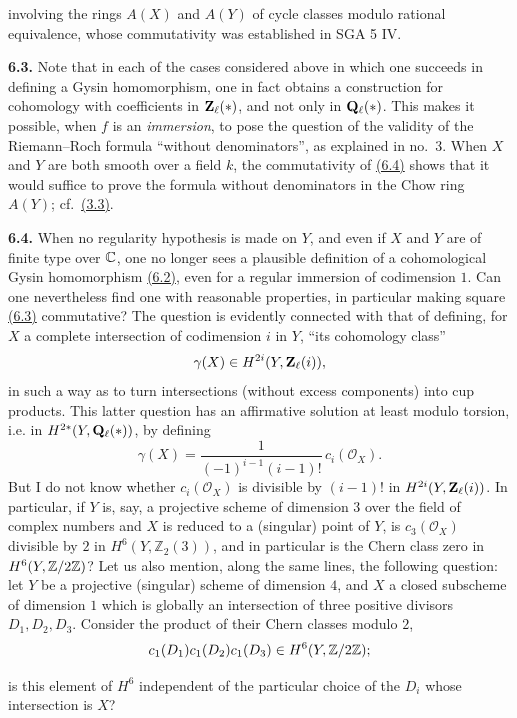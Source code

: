 involving the rings $A(X)$ and $A(Y)$ of cycle classes modulo rational
equivalence, whose commutativity was established in SGA 5 IV.

\noindent{}\textbf{6.3.}
Note that in each of the cases considered above in which one succeeds in
defining a Gysin homomorphism, one in fact obtains a construction for
cohomology with coefficients in $\mathbf Z_\ell(*)$, and not only in $\mathbf Q_\ell(*)$.
This makes it possible, when $f$ is an \emph{immersion}, to pose the question
of the validity of the Riemann--Roch formula ``without denominators'', as
explained in no.~3. When $X$ and $Y$ are both smooth over a field $k$, the
commutativity of \hyperlink{sga6.e14.eq.6-4}{(6.4)} shows that it would suffice to prove the formula
without denominators in the Chow ring $A(Y)$; cf.~\hyperlink{sga6.e14.para.3-3}{(3.3)}.

\noindent{}\textbf{6.4.}
When no regularity hypothesis is made on $Y$, and even if $X$ and $Y$ are of
finite type over $\mathbb C$, one no longer sees a plausible definition of a
cohomological Gysin homomorphism \hyperlink{sga6.e14.para.6-2}{(6.2)}, even for a regular immersion of
codimension $1$. Can one nevertheless find one with reasonable properties,
in particular making square \hyperlink{sga6.e14.para.6-3}{(6.3)} commutative? The question is evidently
connected with that of defining, for $X$ a complete intersection of
codimension $i$ in $Y$, ``its cohomology class''
\[
 \gamma(X)\in H^{2i}(Y,\mathbf Z_\ell(i)),
\]
in such a way as to turn intersections (without excess components) into cup
products. This latter question has an affirmative solution at least modulo
torsion, i.e. in $H^{2*}(Y,\mathbf Q_\ell(*))$, by defining
\[
 \gamma(X)=\frac{1}{(-1)^{i-1}(i-1)!}\,c_i(\mathcal O_X).
\]
But I do not know whether $c_i(\mathcal O_X)$ is divisible by $(i-1)!$ in
$H^{2i}(Y,\mathbf Z_\ell(i))$. In particular, if $Y$ is, say, a projective scheme of
dimension $3$ over the field of complex numbers and $X$ is reduced to a
(singular) point of $Y$, is $c_3(\mathcal O_X)$ divisible by $2$ in
$H^6(Y,\mathbb Z_2(3))$, and in particular is the Chern class zero in
$H^6(Y,\mathbb Z/2\mathbb Z)$? Let us also mention, along the same lines, the following
question: let $Y$ be a projective (singular) scheme of dimension $4$, and
$X$ a closed subscheme of dimension $1$ which is globally an intersection
of three positive divisors $D_1,D_2,D_3$. Consider the product of their
Chern classes modulo $2$,
\[
 c_1(D_1)c_1(D_2)c_1(D_3)\in H^6(Y,\mathbb Z/2\mathbb Z);
\]

is this element of $H^6$ independent of the particular choice of the $D_i$
whose intersection is $X$?

